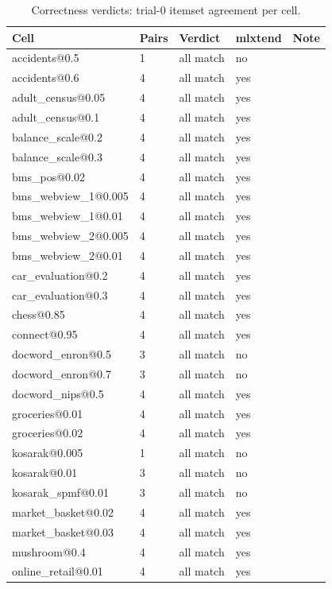 \documentclass[journal,a4paper]{IEEEtran}
\begin{document}
\begin{table}[t]
\centering
\scriptsize
\caption{Correctness verdicts: trial-0 itemset agreement per cell.}
\label{tab:correctness}
\begin{tabular}{lllll}
\toprule
Cell & Pairs & Verdict & mlxtend & Note \\
\midrule
accidents@0.5 & 1 & all match & no &  \\
accidents@0.6 & 4 & all match & yes &  \\
adult\_census@0.05 & 4 & all match & yes &  \\
adult\_census@0.1 & 4 & all match & yes &  \\
balance\_scale@0.2 & 4 & all match & yes &  \\
balance\_scale@0.3 & 4 & all match & yes &  \\
bms\_pos@0.02 & 4 & all match & yes &  \\
bms\_webview\_1@0.005 & 4 & all match & yes &  \\
bms\_webview\_1@0.01 & 4 & all match & yes &  \\
bms\_webview\_2@0.005 & 4 & all match & yes &  \\
bms\_webview\_2@0.01 & 4 & all match & yes &  \\
car\_evaluation@0.2 & 4 & all match & yes &  \\
car\_evaluation@0.3 & 4 & all match & yes &  \\
chess@0.85 & 4 & all match & yes &  \\
connect@0.95 & 4 & all match & yes &  \\
docword\_enron@0.5 & 3 & all match & no &  \\
docword\_enron@0.7 & 3 & all match & no &  \\
docword\_nips@0.5 & 4 & all match & yes &  \\
groceries@0.01 & 4 & all match & yes &  \\
groceries@0.02 & 4 & all match & yes &  \\
kosarak@0.005 & 1 & all match & no &  \\
kosarak@0.01 & 3 & all match & no &  \\
kosarak\_spmf@0.01 & 3 & all match & no &  \\
market\_basket@0.02 & 4 & all match & yes &  \\
market\_basket@0.03 & 4 & all match & yes &  \\
mushroom@0.4 & 4 & all match & yes &  \\
online\_retail@0.01 & 4 & all match & yes &  \\

\end{tabular}
\end{table}
\end{document}
